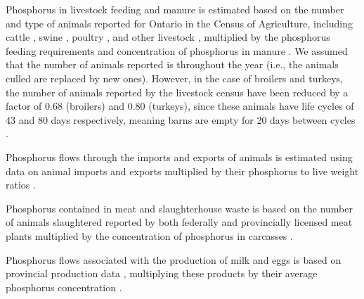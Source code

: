 \documentclass[authoryear]{elsarticle}
\begin{document}
Phosphorus in livestock feeding and manure
is estimated based on the number and type of animals reported for Ontario
in the Census of Agriculture, including cattle \citep{LivestockCensusCattle}, swine \citep{LivestockCensusPig}, poultry \citep{LivestockCensusPoultry}, and other livestock \citep{LivestockCensusSheep, LivestockCensusOtherLivestock},
multiplied by the phosphorus feeding requirements and concentration of phosphorus in manure \citep{NetherlandsCompositions,BrownCompositions, VanStaden2021}.
We assumed that the number of animals reported is throughout the year (i.e., the animals culled are replaced by new ones). However, in the case of broilers and turkeys, the number of animals reported by the livestock census have been reduced by a factor of 0.68 (broilers) and 0.80 (turkeys), since these animals have life cycles of 43 and 80 days respectively, meaning barns are empty for 20 days between cycles \citep{yang2007development}.

Phosphorus flows through the imports and exports of animals is estimated using data on animal imports and exports \citep{CattleImportsExports, HogsImportsExports, SheepImportsExports} multiplied by their phosphorus to live weight ratios \citep{NetherlandsCompositions}.

Phosphorus contained in meat and slaughterhouse waste is based on the number of animals slaughtered reported by both federally and provincially licensed meat plants \citep{SlaughterFederalRedMeat, SlaughterFederalPoultry} multiplied by the concentration of phosphorus in carcasses \citep{LivetoCarcassWeight,hayse1973eviscerated,brake1995relationship,NetherlandsCompositions}.

Phosphorus flows associated with the production of milk and eggs is based on provincial production data \citep{EggOntario,MilkOntario}, multiplying these products by their average phosphorus concentration \citep{NutrientValueHealthCanada,chambers2017chicken}.
\end{document}
